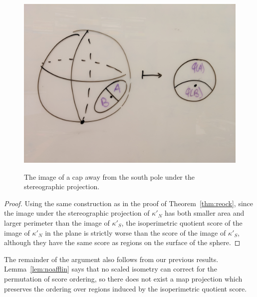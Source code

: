 \begin{figure}
    \centering
    \includegraphics[width=.8\textwidth]{figs/stereo_ipq.jpg}\\
    \caption{ The image of a cap away from the south pole under the stereographic projection. }
    \label{fig:stereoipq}
\end{figure}



\begin{proof}
Using the same construction as in the proof of Theorem~\ref{thm:reock}, since the image under the stereographic projection of $\kappa'_N$ has both smaller area and larger perimeter than the image of $\kappa'_S$, the isoperimetric quotient score of the image of $\kappa'_N$ in the plane is strictly worse than the score of the image of $\kappa'_S$, although they have the same score as regions on the surface of the sphere.

\end{proof}


The remainder of the argument also follows from our previous results.  Lemma~\ref{lem:noafflin} says that no scaled isometry can correct for the permutation of score ordering, so there does not exist a map projection which preserves the ordering over regions induced by the isoperimetric quotient score.






